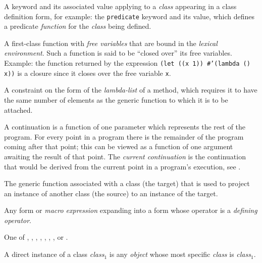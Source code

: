\begin{optDefinition}
\begin{definitions}
     A keyword and its
    associated value applying to a {\em class} appearing in a class definition
    form, for example: the {\tt predicate} keyword and its value, which defines
    a predicate {\em function} for the {\em class} being defined.

     A first-class function with
    {\em free variables} that are bound in the {\em lexical environment}. Such a
    function is said to be ``closed over'' its free variables.  Example: the
    function returned by the expression {\tt (let ((x 1)) \#'(lambda () x))} is
    a closure since it closes over the free variable {\tt x}.

     A constraint on the form of
    the {\em lambda-list} of a method, which requires it to have the same number
    of elements as the generic function to which it is to be attached.

     A continuation is a
    function of one parameter which represents the rest of the program.  For
    every point in a program there is the remainder of the program coming after
    that point; this can be viewed as a function of one argument awaiting the
    result of that point.  The {\em current continuation} is the continuation
    that would be derived from the current point in a program's execution, see
    .

     The
    generic function associated with a class (the target) that is used to
    project an instance of another class (the source) to an instance of the
    target.

     Any form or
    {\em macro expression} expanding into a form whose operator is a {\em
        defining operator}.

     One of
    , , ,
    , , ,
    , or .

     A direct instance of a class
    {\em class$_1$} is any {\em object} whose most specific {\em class} is {\em
        class$_1$}.


\end{definitions}
\end{optDefinition}
